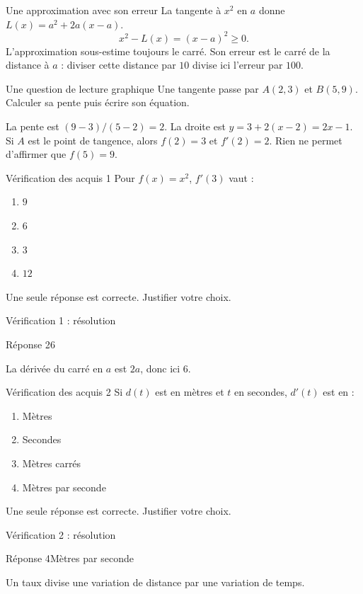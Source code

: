 \documentclass[aspectratio=169,12pt]{beamer}
\begin{document}
\begin{frame}[t,fragile]{Une approximation avec son erreur}
La tangente à $x^2$ en $a$ donne $L(x)=a^2+2a(x-a)$.\[x^2-L(x)=(x-a)^2\ge0.\] L’approximation sous-estime toujours le carré. Son erreur est le carré de la distance à $a$ : diviser cette distance par $10$ divise ici l’erreur par $100$.
\end{frame}
\renewcommand{\slidekind}{COMPRENDRE}
\begin{frame}[t,fragile]{Une question de lecture graphique}
Une tangente passe par $A(2,3)$ et $B(5,9)$. Calculer sa pente puis écrire son équation.\medskip\par La pente est $(9-3)/(5-2)=2$. La droite est $y=3+2(x-2)=2x-1$. Si $A$ est le point de tangence, alors $f(2)=3$ et $f\prime(2)=2$. Rien ne permet d’affirmer que $f(5)=9$.
\end{frame}
\renewcommand{\slidekind}{À VOUS DE JOUER}\begin{frame}[t]{Vérification des acquis 1}
Pour $f(x)=x^2$, $f\prime(3)$ vaut :\begin{enumerate}
\item $9$
\item $6$
\item $3$
\item $12$
\end{enumerate}\medskip Une seule réponse est correcte. Justifier votre choix.\end{frame}
\renewcommand{\slidekind}{COMPRENDRE LA RÉPONSE}\begin{frame}[t]{Vérification 1 : résolution}
\begin{block}{Réponse 2}$6$\end{block}\medskip La dérivée du carré en $a$ est $2a$, donc ici $6$.\end{frame}
\renewcommand{\slidekind}{À VOUS DE JOUER}\begin{frame}[t]{Vérification des acquis 2}
Si $d(t)$ est en mètres et $t$ en secondes, $d\prime(t)$ est en :\begin{enumerate}
\item Mètres
\item Secondes
\item Mètres carrés
\item Mètres par seconde
\end{enumerate}\medskip Une seule réponse est correcte. Justifier votre choix.\end{frame}
\renewcommand{\slidekind}{COMPRENDRE LA RÉPONSE}\begin{frame}[t]{Vérification 2 : résolution}
\begin{block}{Réponse 4}Mètres par seconde\end{block}\medskip Un taux divise une variation de distance par une variation de temps.\end{frame}
\end{document}
